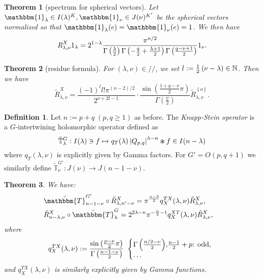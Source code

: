 \documentclass[12pt]{article} %
\newcommand{\Conv}{\mathop{\scalebox{1.5}{\raisebox{-0.2ex}{$\ast$}}}}
\newcommand{\assign}{:=}
\newtheorem{theorem}{Theorem}
\theoremstyle{definition}
\newtheorem{definition}{Definition}
\theoremstyle{exampstyle} \newtheorem{examp}[theorem]{Theorem}
\newcommand{\OpR}{\mbox{\it R}}
\renewcommand{\Q}{Q_{p,q}}
\newcommand{\todd}{\mbox{\textrm{: odd}}}
\begin{document}
\vspace{-2ex}
\begin{theorem}[spectrum for spherical vectors]
Let $\mathbbm{1}_\lambda\in I(\lambda)^K,\mathbbm{1}_\nu\in J(\nu)^{K'}$ be the spherical vectors normalized so that $\mathbbm{1}_\lambda(e)=\mathbbm{1}_\nu(e)=1$. We then have\vspace{-3.0ex}
	\[ \OpR^X_{\lambda, \nu} 1_{\lambda} = 2^{1 -
     \lambda} \frac{\pi^{n / 2}}{\Gamma \left( \frac{\lambda}{2} \right)
     \Gamma \left( - \frac{q}{2} + \frac{\lambda + 1}{2} \right) \Gamma \left(
     \frac{q - \nu + 1}{2} \right)} 1_{\nu}.\]
\end{theorem}
\vspace{-2ex}
\begin{theorem}[residue formula]
	For $(\lambda,\nu)\in//$, we set $l:=\frac{1}{2}\left( \nu-\lambda \right)\in\mathbb{N}$. Then we have
  \[\tilde{R}_{\lambda,\nu}^X  = \frac{ (- 1)^l l!\pi^{(n - 2) / 2} 
		}{2^{ \nu + 2 l-1}}\cdot  \frac{\sin\left( \frac{1+q-\nu}{2}\pi \right)}{\Gamma\left( \frac{\nu}{2} \right)}
	\tilde{R}_{\lambda,\nu}^{ \left\{ o \right\} }.\]
	\end{theorem}
	\begin{definition}
		Let $n:=p+q\;(p,q\ge1)$ as before.
		The {\it Knapp-Stein operator} is a $G$-intertwining holomorphic operator defined as
		\begin{equation*}
		\tilde{\mathbb{T}}_{\lambda}^G:I(\lambda)\ni f\mapsto q_T(\lambda)\myabs{\Q}^{\lambda-n}\Conv f\in I(n-\lambda)
		\end{equation*}
		where $q_T(\lambda,\nu)$ is explicitly given by Gamma factors.
		For $G'=O(p,q+1)$ we similarly define $\tilde{\mathbb{T}}^{G'}_\nu:J(\nu)\to J(n-1-\nu)$.
	\end{definition}
	\begin{theorem}
		
		We have:
\begin{eqnarray}
    & \tilde{\mathbbm{T}}^{G'}_{n-1 - \nu} \circ \tilde{R}^X_{\lambda, n' - \nu} =\pi^{\frac{n - 3}{2}} q^{T X}_X
  (\lambda, \nu) \tilde{R}^X_{\lambda, \nu}, &  \nonumber\\
  & \tilde{R}_{n - \lambda, \nu}^X \circ \tilde{\mathbbm{T}}^G_{\lambda} =2^{2\lambda-n}\pi^{-\frac{n}{2}-1} q^{X T}_X
  (\lambda, \nu) \tilde{R}_{\lambda, \nu}^X, &  \nonumber
  \end{eqnarray}
  where
  \begin{gather*}
  q^{T X}_X (\lambda, \nu) \assign\frac{\sin\left( \frac{p-\nu}{2} \pi\right)}{\Gamma\left( \frac{n-1-\nu}{2} \right)} \ \left\{
	  \begin{array}{@{}l@{}l}
    {\Gamma\left( \frac{n / 2 - \nu}{2} \right)}, & \frac{n - 1}{2}+p\todd,\\
    \dots&
  \end{array} \right.
\end{gather*}
and $q_X^{TX}(\lambda,\nu)$ is similarly explicitly given by Gamma functions.
	\end{theorem}
\end{document}
